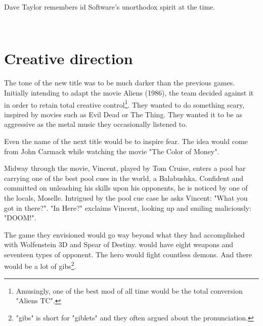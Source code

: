\par
Dave Taylor remembers id Software's unorthodox spirit at the time.\\
\par
\vspace{11pt}
\\
\par
\vspace{11pt}





\section{Creative direction}
The tone of the new title was to be much darker than the previous games. Initially intending to adapt the movie Aliens (1986), the team decided against it in order to retain total creative control\footnote{Amusingly, one of the best mod of all time would be the total conversion "Aliens TC".}. They wanted to do something scary, inspired by movies such as Evil Dead or The Thing. They wanted it to be as aggressive as the metal music they occasionally listened to.\\
\par
Even the name of the next title would be to inspire fear. The idea would come from John Carmack while watching the movie "The Color of Money".\\ 
\par
Midway through the movie, Vincent, played by Tom Cruise, enters a pool bar carrying one of the best pool cues in the world, a Balabushka. Confident and committed on unleashing his skills upon his opponents, he is noticed by one of the locals, Moselle. Intrigued by the pool cue case he asks Vincent: "What you got in there?". "In Here?" exclaims Vincent, looking up and smiling maliciously: "DOOM!".\\
\par

\par
{}
\par
\vspace{-15pt}
The game they envisioned would go way beyond what they had accomplished with Wolfenstein 3D and Spear of Destiny. \doom{} would have eight weapons and seventeen types of opponent. The hero would fight countless demons. And there would be a lot of gibs\footnote{"gibs" is short for "giblets" and they often argued about the pronunciation.}.

